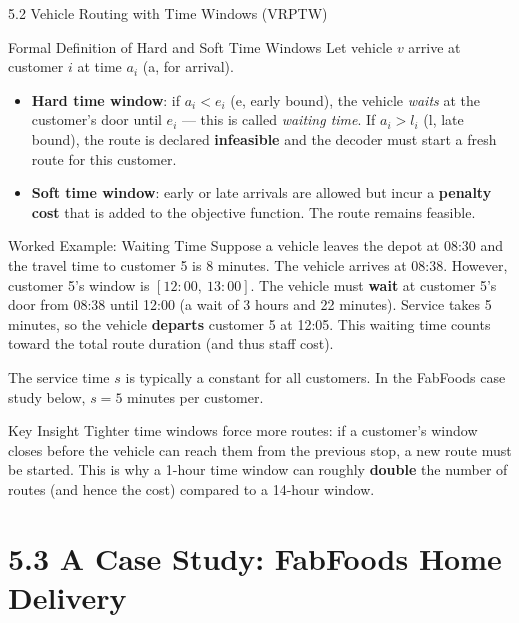 \documentclass[aspectratio=169,10pt]{beamer}
\begin{document}
\begin{frame}[allowframebreaks]{5.2 Vehicle Routing with Time Windows (VRPTW)}
\framebreak

  \begin{block}{Formal Definition of Hard and Soft Time Windows}
    Let vehicle $v$ arrive at customer $i$ at time $a_i$ (a, for arrival).
    \begin{itemize}
      \item \textbf{Hard time window}: if $a_i < e_i$ (e, early bound),
            the vehicle \emph{waits} at the customer's door until $e_i$ —
            this is called \emph{waiting time}.  If $a_i > l_i$ (l, late
            bound), the route is declared \textbf{infeasible} and the
            decoder must start a fresh route for this customer.
      \item \textbf{Soft time window}: early or late arrivals are allowed
            but incur a \textbf{penalty cost} that is added to the
            objective function.  The route remains feasible.
    \end{itemize}
  \end{block}

  \begin{exampleblock}{Worked Example: Waiting Time}
    Suppose a vehicle leaves the depot at 08:30 and the travel time to
    customer 5 is 8 minutes.  The vehicle arrives at 08:38.  However,
    customer 5's window is $[12\!:\!00,\ 13\!:\!00]$.  The vehicle must
    \textbf{wait} at customer 5's door from 08:38 until 12:00 (a wait of
    3 hours and 22 minutes).  Service takes 5 minutes, so the vehicle
    \textbf{departs} customer 5 at 12:05.  This waiting time counts toward
    the total route duration (and thus staff cost).
  \end{exampleblock}

  The service time $s$ is typically a constant for all customers.  In the
  FabFoods case study below, $s = 5$ minutes per customer.

  \begin{alertblock}{Key Insight}
    Tighter time windows force more routes: if a customer's window closes
    before the vehicle can reach them from the previous stop, a new route
    must be started.  This is why a 1-hour time window can roughly
    \textbf{double} the number of routes (and hence the cost) compared to a
    14-hour window.
  \end{alertblock}

\end{frame}

\section{5.3 A Case Study: FabFoods Home Delivery}
\end{document}
